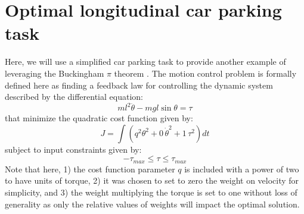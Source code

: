 \section{Optimal longitudinal car parking task}
\label{sec:optimalcar}
Here, we will use a simplified car parking task to provide another example of leveraging the Buckingham $\pi$ theorem . The motion control problem is formally defined here as finding a feedback law for controlling the dynamic system described by the differential equation:
\begin{equation}
ml^2 \ddot{\theta} - mgl \sin \theta = \tau
\label{eq:pendulum_dynamics}
\end{equation}
that minimize the quadratic cost function given by:
\begin{equation}
J = \int{( q^2 \theta^2 + 0 \, \dot{\theta}^2 + 1 \, \tau^2 ) dt }
\label{eq:pendulum_cost}
\end{equation}
subject to input constraints given by:
\begin{equation}
- \tau_{max} \leq \tau \leq \tau_{max}
\label{eq:pendulum_constraints}
\end{equation}
Note that here, 1) the cost function parameter $q$ is included with a power of two to have units of torque, 2) it was chosen to set to zero the weight on velocity for simplicity, and 3) the weight multiplying the torque is set to one without loss of generality as only the relative values of weights will impact the optimal solution. 

